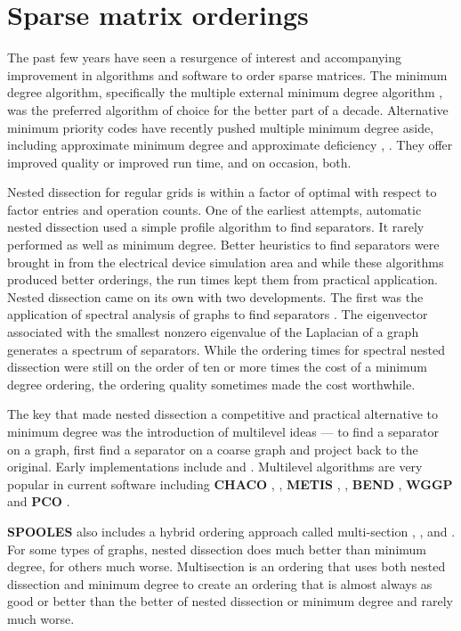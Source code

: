 \section{Sparse matrix orderings}
\label{section:ordering}
\par
The past few years have seen a resurgence of interest and
accompanying improvement in algorithms and software to order sparse
matrices.
The minimum degree algorithm, specifically the multiple external
minimum degree algorithm \cite{liu85-mmd},
was the preferred algorithm of choice for
the better part of a decade.
Alternative minimum priority codes have recently pushed multiple
minimum degree aside,
including approximate minimum degree \cite{ame96-amd} and
approximate deficiency \cite{ng96-mindefIdaho},
\cite{roth98-minfill}.
They offer improved quality or improved run time, and on occasion,
both. 
\par
Nested dissection for regular grids \cite{geo73-nested} is within a
factor of optimal with respect to factor entries and operation counts.
One of the earliest attempts, automatic nested dissection 
\cite{geo81-book} used a simple profile algorithm to find separators.
It rarely performed as well as minimum degree.
Better heuristics to find separators were brought in from the
electrical device simulation area \cite{lei89-fidmat} and while
these algorithms produced better orderings, the run times kept
them from practical application.
Nested dissection came on its own with two developments.
The first was the application of spectral analysis of graphs to
find separators \cite{pot90-partition}.
The eigenvector associated with the smallest nonzero eigenvalue of
the Laplacian of a graph generates a spectrum of separators.
While the ordering times for spectral nested dissection were still
on the order of ten or more times the cost of a minimum degree ordering,
the ordering quality sometimes made the cost worthwhile.
\par
The key that made nested dissection a competitive and practical
alternative to minimum degree was the introduction of multilevel
ideas ---
to find a separator on a graph, first find a separator on a coarse
graph and project back to the original.
Early implementations include \cite{bar93-partition}
and \cite{bui93-partition}.
Multilevel algorithms are very popular in current software
including
{\bf CHACO}
\cite{hen93-chaco},
\cite{hen92-partition},
{\bf METIS}
\cite{kar95-multilevel},
\cite{karypis98metis},
{\bf BEND}
\cite{hr98-msnd},
{\bf WGGP}
\cite{gup96-WGPP}
and
{\bf PCO}
\cite{rag95-PCO}.
\par
{\bf SPOOLES} also includes a hybrid ordering approach called
multi-section 
\cite{ash97-partition},
\cite{ash98-maxflow},
\cite{ash98-multisection} and
\cite{ro95-hybrid}.
For some types of graphs, nested dissection does much better than
minimum degree, for others much worse.
Multisection is an ordering that uses both nested dissection and
minimum degree to create an ordering that is almost always as good
or better than the better of nested dissection or minimum degree
and rarely much worse.
\par
